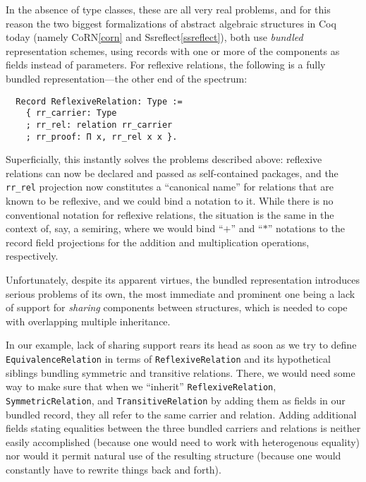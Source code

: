 \documentclass[a4paper,10pt,runningheads]{llncs}
\begin{document}

In the absence of type classes, these are all very real problems, and for this reason the two biggest formalizations of abstract algebraic structures in Coq today (namely CoRN\ref{corn} and Ssreflect\ref{ssreflect}), both use \emph{bundled} representation schemes, using records with one or more of the components as fields instead of parameters. For reflexive relations, the following is a fully bundled representation---the other end of the spectrum:
\begin{lstlisting}
  Record ReflexiveRelation: Type :=
    { rr_carrier: Type
    ; rr_rel: relation rr_carrier
    ; rr_proof: Π x, rr_rel x x }.
\end{lstlisting}
Superficially, this instantly solves the problems described above: reflexive relations can now be declared and passed as self-contained packages, and the \lstinline|rr_rel| projection now constitutes a ``canonical name'' for relations that are known to be reflexive, and we could bind a notation to it. While there is no conventional notation for reflexive relations, the situation is the same in the context of, say, a semiring, where we would bind ``$+$'' and ``$*$'' notations to the record field projections for the addition and multiplication operations, respectively.


Unfortunately, despite its apparent virtues, the bundled representation introduces serious problems of its own, the most immediate and prominent one being a lack of support for \emph{sharing} components between structures, which is needed to cope with overlapping multiple inheritance.

In our example, lack of sharing support rears its head as soon as we try to define \lstinline|EquivalenceRelation| in terms of \lstinline|ReflexiveRelation| and its hypothetical siblings bundling symmetric and transitive relations. There, we would need some way to make sure that when we ``inherit'' \lstinline|ReflexiveRelation|, \lstinline|SymmetricRelation|, and \lstinline|TransitiveRelation| by adding them as fields in our bundled record, they all refer to the same carrier and relation. Adding additional fields stating equalities between the three bundled carriers and relations is neither easily accomplished (because one would need to work with heterogenous equality) nor would it permit natural use of the resulting structure (because one would constantly have to rewrite things back and forth).
\end{document}
